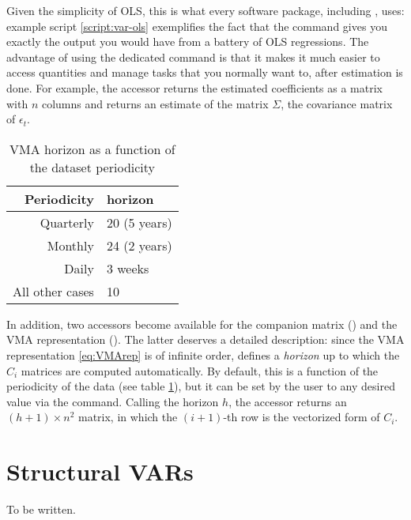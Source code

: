 Given the simplicity of OLS, this is what every software package,
including , uses: example script \ref{script:var-ols}
exemplifies the fact that the  command gives you exactly the
output you would have from a battery of OLS regressions. The advantage
of using the dedicated command is that it makes it much easier to
access quantities and manage tasks that you normally want to, after
estimation is done. For example, the  accessor returns
the estimated coefficients as a matrix with $n$ columns and
 returns an estimate of the matrix $\Sigma$, the
covariance matrix of $\epsilon_t$.

\begin{table}[htbp]
  \centering
  \begin{tabular}{rl}
    \hline
    Periodicity & horizon \\
    \hline
    Quarterly & 20 (5 years) \\
    Monthly & 24 (2 years) \\
    Daily & 3 weeks \\
    All other cases & 10 \\
    \hline
  \end{tabular}
  \caption{VMA horizon as a function of the dataset periodicity}
  \label{tab:var-horizon}
\end{table}

In addition, two accessors become available for the
companion matrix () and the VMA representation
(). The latter deserves a detailed
description: since the VMA representation \eqref{eq:VMArep} is of
infinite order,  defines a \emph{horizon} up to which the
$C_i$ matrices are computed automatically. By default, this is a
function of the periodicity of the data (see table
\ref{tab:var-horizon}), but it can be set by the user to any desired
value via the  command. Calling the horizon $h$, the
 accessor returns an $(h+1) \times n^2$ matrix, in which
the $(i+1)$-th row is the vectorized form of $C_i$.


\section{Structural VARs}
\label{sec:svar}

To be written. 

